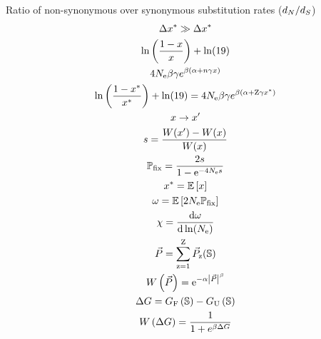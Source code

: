 \documentclass{article}
\begin{document}
Ratio of non-synonymous over synonymous substitution rates ($d_N / d_S$)
\begin{gather*}
\Delta  x^{*} \gg \Delta  x^{*} \\
\ln \left( \frac{1 - x}{x} \right) + \ln (19) \\
4N_{\text{e}} \beta \gamma e^{\beta (\alpha + n \gamma x)}\\
\ln \left( \frac{1 - x^{*}}{x^{*}} \right) + \ln (19) = 4N_{\text{e}} \beta \gamma e^{\beta (\alpha + \text{Z} \gamma x^{*})}\\
x \rightarrow x' \\
s = \frac{W(x') - W(x)}{W( x)} \\
\mathbb{P}_{\text{fix}} = \frac{ 2 s}{1 - \text{e}^{-4N_{\text{e}} s}} \\
x^{*} = \operatorname{\mathbb{E}} \left[ x \right] \\
\omega = \operatorname{\mathbb{E}} \left[ 2 N_{\text{e}} \mathbb{P}_{\text{fix}} \right]\\
\chi = \frac{ \mathrm{d} \omega}{\mathrm{d} \ln (N_{\text{e}})} \\
\vec{P} = \sum\limits_{\text{z}=1}^{\text{Z}} \vec{P}_{\text{z}}(\mathbb{S}) \\
W\left( \vec{P} \right) = \text{e}^{-\alpha \left| \vec{P} \right|^{\beta}}\\
\Delta G = G_{\text{F}} \left(\mathbb{S}\right) - G_{\text{U}} \left(\mathbb{S}\right) \\
W\left( \Delta G \right) = \dfrac{1}{1 + e^{\beta \Delta G }}\\
\end{gather*}
\end{document}
